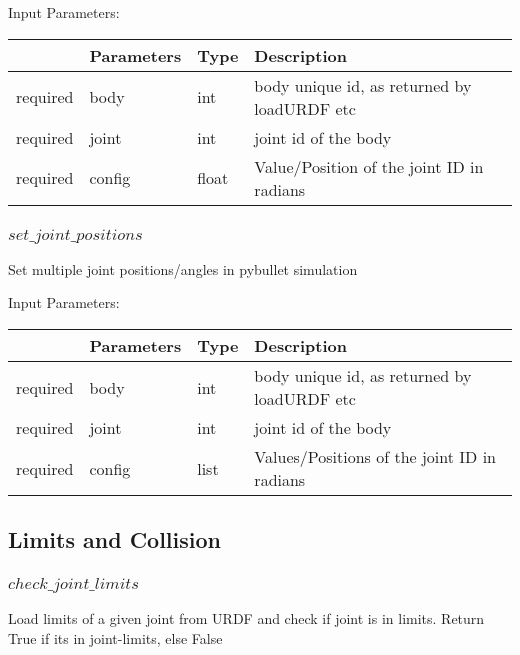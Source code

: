 \documentclass[
	ngerman,
	accentcolor=9c,%
	type=intern,
	marginpar=false
	]{tudapub}
\begin{document}
\vspace{0.5cm}
\noindent Input Parameters:
\vspace{0.5cm}

\begin{tabular}{|p{}|p{}|p{}| p{}|}
\hline
 & \textbf{Parameters} & \textbf{Type} & \textbf{Description} \\
\hline
required & body & int & body unique id, as returned by loadURDF etc\\
\hline
required & joint &  int & joint id of the body \\
\hline
required & config & float & Value/Position of the joint ID in radians\\
\hline

\end{tabular}
\vspace{0.5cm}


\subsubsection{$set\_joint\_positions$}
\noindent Set multiple joint positions/angles in pybullet simulation

\vspace{0.5cm}
\noindent Input Parameters:
\vspace{0.5cm}

\begin{tabular}{|p{}|p{}|p{}| p{}|}
\hline
 & \textbf{Parameters} & \textbf{Type} & \textbf{Description} \\
\hline
required & body & int & body unique id, as returned by loadURDF etc\\
\hline
required & joint &  int & joint id of the body \\
\hline
required & config & list & Values/Positions of the joint ID in radians\\
\hline

\end{tabular}
\vspace{0.5cm}





\subsection{Limits and Collision}



\subsubsection{$check\_joint\_limits$}
\noindent Load limits of a given joint from URDF and check if joint is in limits. Return True if its in joint-limits, else False
\end{document}

